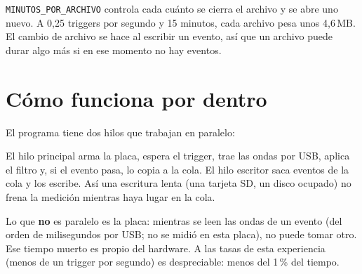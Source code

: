 \documentclass[11pt,a4paper]{article}
\newcommand{\code}[1]{\texttt{#1}}
\begin{document}
\code{MINUTOS\_POR\_ARCHIVO} controla cada cuánto se cierra el archivo y se abre uno
nuevo. A 0{,}25 triggers por segundo y 15 minutos, cada archivo pesa unos 4{,}6\,MB.
El cambio de archivo se hace al escribir un evento, así que un archivo puede durar
algo más si en ese momento no hay eventos.

\section{Cómo funciona por dentro}
\label{sec:paralelo}

El programa tiene dos hilos que trabajan en paralelo:

\begin{center}
\end{center}

El hilo principal arma la placa, espera el trigger, trae las ondas por USB, aplica el
filtro y, si el evento pasa, lo copia a la cola. El hilo escritor saca eventos de la
cola y los escribe. Así una escritura lenta (una tarjeta SD, un disco ocupado) no
frena la medición mientras haya lugar en la cola.

Lo que \textbf{no} es paralelo es la placa: mientras se leen las ondas de un evento
(del orden de milisegundos por USB; no se midió en esta placa), no puede tomar otro. Ese tiempo muerto es propio del
hardware. A las tasas de esta experiencia (menos de un trigger por segundo) es
despreciable: menos del 1\,\% del tiempo.
\end{document}
